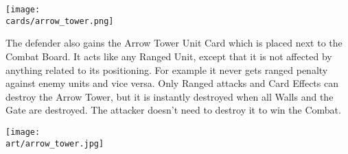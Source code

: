 \begin{multicols}{2}
\begin{center}
  \texttt{[image: \\cards/arrow\_tower.png]}
\end{center}
The defender also gains the Arrow Tower Unit Card which is placed next to the Combat Board.
It acts like any Ranged  Unit, except that it is not affected by anything related to its positioning.
For example it never gets ranged penalty against enemy units and vice versa.
Only Ranged attacks and Card Effects can destroy the Arrow Tower, but it is instantly destroyed when all Walls and the Gate are destroyed.
The attacker doesn't need to destroy it to win the Combat.

\vspace{1em}

\begin{center}
  \texttt{[image: \\art/arrow\_tower.jpg]}
\end{center}

\end{multicols}
